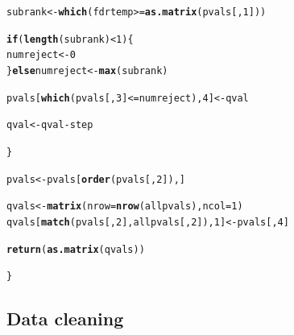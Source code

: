 \documentclass[11pt, a4paper]{article}\usepackage[]{graphicx}\usepackage[]{color}
\makeatletter
\newcommand{\hlnum}[1]{\textcolor[rgb]{0.686,0.059,0.569}{#1}}%
\newcommand{\hlopt}[1]{\textcolor[rgb]{0,0,0}{#1}}%
\newcommand{\hlstd}[1]{\textcolor[rgb]{0.345,0.345,0.345}{#1}}%
\newcommand{\hlkwa}[1]{\textcolor[rgb]{0.161,0.373,0.58}{\textbf{#1}}}%
\newcommand{\hlkwb}[1]{\textcolor[rgb]{0.69,0.353,0.396}{#1}}%
\newcommand{\hlkwc}[1]{\textcolor[rgb]{0.333,0.667,0.333}{#1}}%
\newcommand{\hlkwd}[1]{\textcolor[rgb]{0.737,0.353,0.396}{\textbf{#1}}}%
\newenvironment{kframe}{%
 \def\at@end@of@kframe{}%
 \ifinner\ifhmode%
  \def\at@end@of@kframe{\end{minipage}}%
  \begin{minipage}{\columnwidth}%
 \fi\fi%
 \def\FrameCommand##1{\hskip\@totalleftmargin \hskip-\fboxsep
 \colorbox{shadecolor}{##1}\hskip-\fboxsep
     \hskip-\linewidth \hskip-\@totalleftmargin \hskip\columnwidth}%
 \MakeFramed {\advance\hsize-\width
   \@totalleftmargin\z@ \linewidth\hsize
   \@setminipage}}%
 {\par\unskip\endMakeFramed%
 \at@end@of@kframe}
\newenvironment{knitrout}{}{} %
\makeatother
\begin{document}
\begin{knitrout}
\begin{kframe}
\begin{alltt}
            \hlstd{subrank} \hlkwb{<-} \hlkwd{which}\hlstd{(fdrtemp} \hlopt{>=} \hlkwd{as.matrix}\hlstd{(pvals[,} \hlnum{1}\hlstd{]))}

            \hlkwa{if} \hlstd{(}\hlkwd{length}\hlstd{(subrank)} \hlopt{<} \hlnum{1}\hlstd{) \{}
                \hlstd{numreject} \hlkwb{<-} \hlnum{0}
            \hlstd{\}} \hlkwa{else} \hlstd{numreject} \hlkwb{<-} \hlkwd{max}\hlstd{(subrank)}

            \hlstd{pvals[}\hlkwd{which}\hlstd{(pvals[,} \hlnum{3}\hlstd{]} \hlopt{<=} \hlstd{numreject),} \hlnum{4}\hlstd{]} \hlkwb{<-} \hlstd{qval}

            \hlstd{qval} \hlkwb{<-} \hlstd{qval} \hlopt{-} \hlstd{step}

        \hlstd{\}}

        \hlstd{pvals} \hlkwb{<-} \hlstd{pvals[}\hlkwd{order}\hlstd{(pvals[,} \hlnum{2}\hlstd{]), ]}

        \hlstd{qvals} \hlkwb{<-} \hlkwd{matrix}\hlstd{(}\hlkwc{nrow} \hlstd{=} \hlkwd{nrow}\hlstd{(allpvals),} \hlkwc{ncol} \hlstd{=} \hlnum{1}\hlstd{)}
        \hlstd{qvals[}\hlkwd{match}\hlstd{(pvals[,} \hlnum{2}\hlstd{], allpvals[,} \hlnum{2}\hlstd{]),} \hlnum{1}\hlstd{]} \hlkwb{<-} \hlstd{pvals[,} \hlnum{4}\hlstd{]}

        \hlkwd{return}\hlstd{(}\hlkwd{as.matrix}\hlstd{(qvals))}

    \hlstd{\}}
\end{alltt}
\end{kframe}
\end{knitrout}
    \subsection{Data cleaning}
\end{document}
